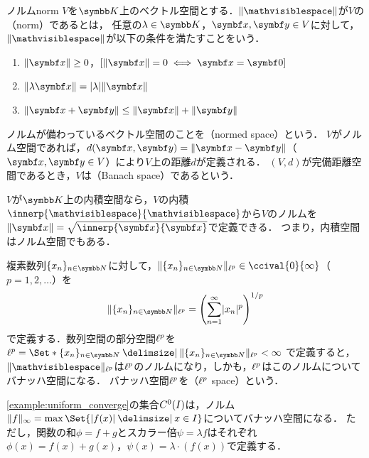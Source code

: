 \documentclass[../../main]{subfiles}
\begin{document}
\begin{definition}{ノルム}{norm}\index{\(\vnorm{\holder}\)}
  \(V\)を\(\numset{K}\)上のベクトル空間とする．\(\vnorm{\holder}\)が\(V\)の（norm）であるとは，
  任意の\(\lambda\in\numset{K}\)，\(\vect{x},\vect{y}\in V\)に対して，\(\vnorm{\holder}\)が以下の条件を満たすことをいう．
  \begin{enumerate}
    \item \(\vnorm{\vect{x}}\geq 0\)，\([\vnorm{\vect{x}}=0\iff\vect{x}=\zvec]\)
    \item \(\vnorm{\lambda\vect{x}}=\abs{\lambda}\vnorm{\vect{x}}\)
    \item \(\vnorm{\vect{x}+\vect{y}}\leq\vnorm{\vect{x}}+\vnorm{\vect{y}}\)
  \end{enumerate}
\end{definition}

ノルムが備わっているベクトル空間のことを（normed space）という．
\(V\)がノルム空間であれば，\(d(\vect{x},\vect{y})=\vnorm{\vect{x}-\vect{y}}\)（\(\vect{x},\vect{y}\in V\)）により\(V\)上の距離\(d\)が定義される．
\((V,d)\)が完備距離空間であるとき，\(V\)は（Banach space）であるという．

\begin{example}
  \(V\)が\(\numset{K}\)上の内積空間なら，\(V\)の内積\(\innerp{\holder}{\holder}\)から\(V\)のノルムを\(\vnorm{\vect{x}}=\sqrt{\innerp{\vect{x}}{\vect{x}}}\)で定義できる．
  つまり，内積空間はノルム空間でもある．
\end{example}

\begin{example}[\(\lebesgue{p}\)空間]
  複素数列\(\seq{x_n}_{n\in\numset{N}}\)に対して，\(\vnorm{\seq{x_n}_{n\in\numset{N}}}_{\lebesgue{p}}\in\ccival{0}{\infty}\)（\(p=1,2,\dotsc\)）を
  \[
    \vnorm{\seq{x_n}_{n\in\numset{N}}}_{\lebesgue{p}} = \pqty*{\sum_{n=1}^\infty\abs{x_n}^p}^{1/p}
  \]
  で定義する．数列空間の部分空間\(\lebesgue{p}\)を\(\lebesgue{p}=\Set*{\seq{x_n}_{n\in\numset{N}}\given\vnorm{\seq{x_n}_{n\in\numset{N}}}_{\lebesgue{p}}<\infty}\)
  で定義すると，\(\vnorm{\holder}_{\lebesgue{p}}\)は\(\lebesgue{p}\)のノルムになり，しかも，\(\lebesgue{p}\)はこのノルムについてバナッハ空間になる．
  バナッハ空間\(\lebesgue{p}\)を（\(\lebesgue{p}\) space）という．
\end{example}

\begin{example}
  \cref{example:uniform_converge}の集合\(C^0(I)\)は，ノルム\(\vnorm{f}_\infty=\max\Set{\abs{f(x)}\given x\in I}\)についてバナッハ空間になる．
  ただし，関数の和\(\phi=f+g\)とスカラー倍\(\psi=\lambda f\)はそれぞれ\(\phi(x)=f(x)+g(x)\)，\(\psi(x)=\lambda\cdot(f(x))\)で定義する．
\end{example}
\end{document}
